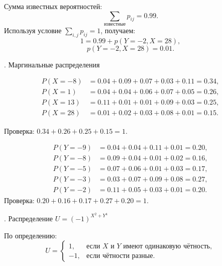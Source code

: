 \documentclass[a4paper,14pt]{extarticle}
\begin{document}
            Сумма известных вероятностей:
            \[
                \sum_{\text{известные}} p_{ij} = 0.99.
            \]
            Используя условие $\sum_{i,j} p_{ij} = 1$, получаем:
            \[
                1 = 0.99 + p(Y=-2, X=28),
            \]
            \[
                \boxed{p(Y=-2, X=28) = 0.01.}
            \]
            
            . Маргинальные распределения
            
            \[
                \begin{aligned}
                    P(X=-8) &= 0.04 + 0.09 + 0.07 + 0.03 + 0.11 = 0.34, \\
                    P(X=1)  &= 0.04 + 0.04 + 0.06 + 0.07 + 0.05 = 0.26, \\
                    P(X=13) &= 0.11 + 0.01 + 0.01 + 0.09 + 0.03 = 0.25, \\
                    P(X=28) &= 0.01 + 0.02 + 0.03 + 0.08 + 0.01 = 0.15.
                \end{aligned}
            \]
            
            Проверка: $0.34 + 0.26 + 0.25 + 0.15 = 1.$
            
            \[
                \begin{aligned}
                    P(Y=-9) &= 0.04 + 0.04 + 0.11 + 0.01 = 0.20, \\
                    P(Y=-8) &= 0.09 + 0.04 + 0.01 + 0.02 = 0.16, \\
                    P(Y=-5) &= 0.07 + 0.06 + 0.01 + 0.03 = 0.17, \\
                    P(Y=-3) &= 0.03 + 0.07 + 0.09 + 0.08 = 0.27, \\
                    P(Y=-2) &= 0.11 + 0.05 + 0.03 + 0.01 = 0.20.
                \end{aligned}
            \]
            Проверка: $0.20 + 0.16 + 0.17 + 0.27 + 0.20 = 1.$
            
            . Распределение $U = (-1)^{X^2 + Y^4}$
            
            По определению:
            \[
                U =
                \begin{cases}
                    1, & \text{если } X \text{ и } Y \text{ имеют одинаковую чётность},\\
                    -1, & \text{если чётности разные.}
                \end{cases}
            \]
            
\end{document}
